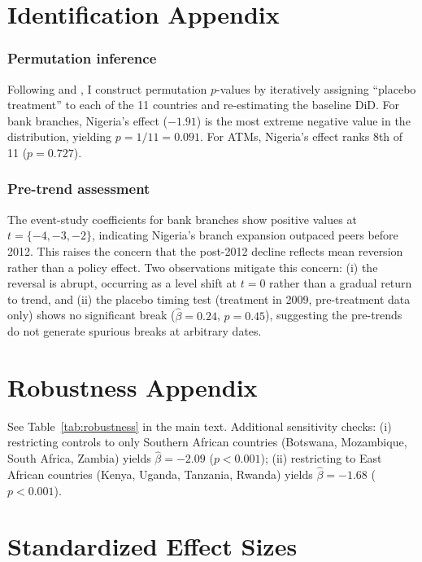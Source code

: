 \documentclass[12pt]{article}
\begin{document}
\section{Identification Appendix}

\subsubsection*{Permutation inference} Following \citet{abadie2010synthetic} and \citet{abadie2003economic}, I construct permutation $p$-values by iteratively assigning ``placebo treatment'' to each of the 11 countries and re-estimating the baseline DiD. For bank branches, Nigeria's effect ($-1.91$) is the most extreme negative value in the distribution, yielding $p = 1/11 = 0.091$. For ATMs, Nigeria's effect ranks 8th of 11 ($p = 0.727$).

\subsubsection*{Pre-trend assessment} The event-study coefficients for bank branches show positive values at $t = \{-4, -3, -2\}$, indicating Nigeria's branch expansion outpaced peers before 2012. This raises the concern that the post-2012 decline reflects mean reversion rather than a policy effect. Two observations mitigate this concern: (i) the reversal is abrupt, occurring as a level shift at $t = 0$ rather than a gradual return to trend, and (ii) the placebo timing test (treatment in 2009, pre-treatment data only) shows no significant break ($\hat{\beta} = 0.24$, $p = 0.45$), suggesting the pre-trends do not generate spurious breaks at arbitrary dates.

\section{Robustness Appendix}

See Table~\ref{tab:robustness} in the main text. Additional sensitivity checks: (i) restricting controls to only Southern African countries (Botswana, Mozambique, South Africa, Zambia) yields $\hat{\beta} = -2.09$ ($p < 0.001$); (ii) restricting to East African countries (Kenya, Uganda, Tanzania, Rwanda) yields $\hat{\beta} = -1.68$ ($p < 0.001$).

\section{Standardized Effect Sizes}
\label{sec:sde}


\end{document}
